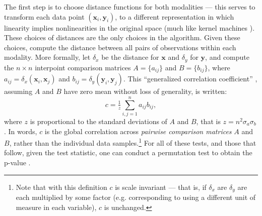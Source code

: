 \documentclass[11pt]{article}
\newcommand{\note}[2][]{\added[#1,remark={#2}]{}}
\providecommand{\mb}[1]{\boldsymbol{#1}}
\newcommand{\G}{c}
\newcommand{\cs}[1]{{\note{cs: #1}}}
\newcommand{\mbx}{\ensuremath{\mb{x}}}
\newcommand{\mby}{\ensuremath{\mb{y}}}
\begin{document}
The first step is to choose distance functions for both modalities --- this serves to transform each data point $(\mbx_i,\mby_i)$, to a different representation in which linearity implies nonlinearities in the original space 
(much like kernel machines \cite{scholkopf2002learning}).  
These choices of distances are the only choices in the algorithm. 
\cs{I was confused here, as I thought you mean which distance metrics to use; but you probably meant we always use distance measures for pairwise comparisons of the data.}
Given these choices, compute the distance between all pairs of observations within each modality.  More formally, let $\delta_x$ be the distance for $\mbx$ and $\delta_y$ for $\mb{y}$, and compute the $n \times n$ interpoint comparison matrices $A=\{a_{ij}\}$ and $B=\{b_{ij}\}$, where $a_{ij}=\delta_x(\mb{x}_i,\mb{x}_j)$ and  $b_{ij}=\delta_y(\mb{y}_i,\mb{y}_j)$.  
This ``generalized correlation coefficient''  \cite{Spearman1904,Mantel1967,KendallBook}, assuming $A$ and $B$ have zero mean without loss of generality, is written:
\begin{equation}
\label{generalCoef}
\G= \tfrac{1}{z} {\textstyle \sum_{i,j=1}^n a_{ij} b_{ij}},
\end{equation}
%
%
where $z$ is proportional to the standard deviations of $A$ and $B$, that is $z=n^2\sigma_a \sigma_b$.
In words, $\G$ is the global correlation across \emph{pairwise comparison matrices} $A$ and $B$, rather than the individual data samples.\footnote{Note that with this definition $\G$ is scale  invariant --- that is, if $\delta_x$ are $\delta_y$ are each multiplied by some factor (e.g. corresponding to using a different unit of measure in each variable), $\G$ is unchanged.} 
For all of these tests, and those that follow, given the test statistic, one can conduct a permutation test to obtain the p-value \cite{GoodPermutationBook}.
\end{document}

